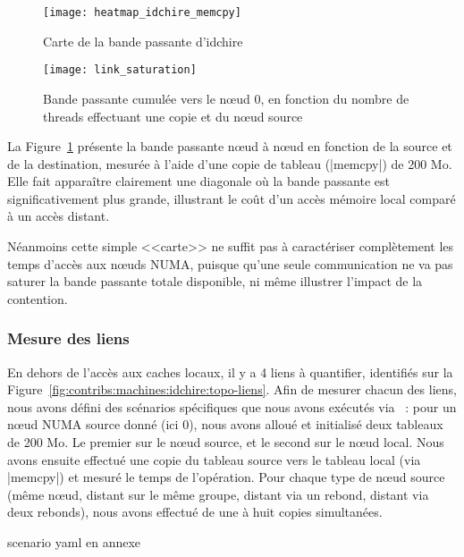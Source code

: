 \begin{figure}[t!]
  \centering
  \texttt{[image: heatmap\_idchire\_memcpy]}
  \caption{Carte de la bande passante d'idchire}\label{fig:contribs:machines:idchire:heatmap}
\end{figure}

\begin{figure}[h!]
  \centering
  \texttt{[image: link\_saturation]}
  \caption{Bande passante cumulée vers le nœud 0, en fonction du nombre de threads effectuant une copie et du nœud source}\label{fig:contribs:machines:idchire:saturation}
\end{figure}


La Figure~\ref{fig:contribs:machines:idchire:heatmap} présente la bande passante nœud à nœud en fonction de la source et de la destination, mesurée à l'aide d'une copie de tableau (|memcpy|) de 200 Mo.
Elle fait apparaître clairement une diagonale où la bande passante est significativement plus grande, illustrant le coût d'un accès mémoire local comparé à un accès distant.

Néanmoins cette simple <<carte>> ne suffit pas à caractériser complètement les temps d'accès aux nœuds NUMA, puisque qu'une seule communication ne va pas saturer la bande passante totale disponible, ni même illustrer l'impact de la contention.


\subsubsection{Mesure des liens}\label{sec:contribs:machines:idchire:liens}

En dehors de l'accès aux caches locaux, il y a 4 liens à quantifier, identifiés sur la Figure~\ref{fig:contribs:machines:idchire:topo-liens}.
Afin de mesurer chacun des liens, nous avons défini des scénarios spécifiques que nous avons exécutés via \outil~: pour un nœud NUMA source donné (ici 0), nous avons alloué et initialisé deux tableaux de 200 Mo. Le premier sur le nœud source, et le second sur le nœud local. Nous avons ensuite effectué une copie du tableau source vers le tableau local (via |memcpy|) et mesuré le temps de l'opération.
Pour chaque type de nœud source (même nœud, distant sur le même groupe, distant via un rebond, distant via deux rebonds), nous avons effectué de une à huit copies simultanées.

\begin{todo}
  scenario yaml en annexe
\end{todo}


